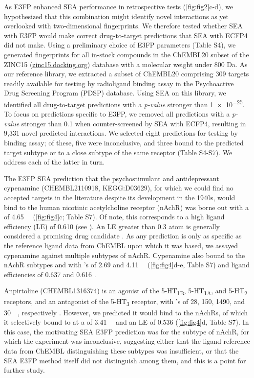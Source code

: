 \documentclass[../main.tex]{subfiles}
\begin{document}
\begin{refsection}
As E3FP enhanced SEA performance in retrospective tests (\cref{fig:fig2}c-d), we hypothesized that this combination might identify novel interactions as yet overlooked with two-dimensional fingerprints.
We therefore tested whether SEA with E3FP would make correct drug-to-target predictions that SEA with ECFP4 did not make.
Using a preliminary choice of E3FP parameters (Table S4), we generated fingerprints for all in-stock compounds in the ChEMBL20 subset of the ZINC15 (\url{zinc15.docking.org}) database with a molecular weight under 800 Da.
As our reference library, we extracted a subset of ChEMBL20 comprising 309 targets readily available for testing by radioligand binding assay in the Psychoactive Drug Screening Program (PDSP) \cite{besnard_2012} database.
Using SEA on this library, we identified all drug-to-target predictions with a  \emph{p-value} stronger than \num{1e-25}.
To focus on predictions specific to E3FP, we removed all predictions with a  \emph{p-value} stronger than 0.1 when counter-screened by SEA with ECFP4, resulting in 9,331 novel predicted interactions.
We selected eight predictions for testing by binding assay; of these, five were inconclusive, and three bound to the predicted target subtype or to a close subtype of the same receptor (Table S4-S7).
We address each of the latter in turn.

    The E3FP SEA prediction that the psychostimulant and antidepressant  \cite{kanehisa_2017,kanehisa_2016,kanehisa_2000} cypenamine (CHEMBL2110918, KEGG:D03629), for which we could find no accepted targets in the literature despite its development in the 1940s, would bind to the human nicotinic acetylcholine receptor (nAchR)  was borne out with a  \Ki{} of \SI{4.65}{\micro\molar} (\cref{fig:fig4}c; Table S7).
Of note, this corresponds to a high ligand efficiency (LE) of 0.610  \LEunit{} (see ).
An LE greater than 0.3  \LEunit{} atom is generally considered a promising drug candidate  \cite{hopkins_2014}.
As any prediction is only as specific as the reference ligand data from ChEMBL upon which it was based, we assayed cypenamine against multiple subtypes of nAchR.
Cypenamine also bound to the nAchR subtypes  and  with \Ki's of 2.69 and \SI{4.11}{\micro\molar} (\cref{fig:fig4}d-e, Table S7) and ligand efficiencies of 0.637 and 0.616 \LEunit{}.

    Anpirtoline (CHEMBL1316374) is an agonist of the 5-HT\textsubscript{1B}, 5-HT\textsubscript{1A}, and 5-HT\textsubscript{2} receptors, and an antagonist of the 5-HT\textsubscript{3} receptor, with  \Ki's of 28, 150, 1490, and \SI{30}{\nano\molar}, respectively  \cite{schlicker_1992,metzenauer_1992}.
However, we predicted it would bind to the nAchRs, of which it selectively bound to  at a  \Ki{} of \SI{3.41}{\micro\molar} and an LE of 0.536 \LEunit{} (\cref{fig:fig4}d, Table S7).
In this case, the motivating SEA E3FP prediction was for the  subtype of nAchR, for which the experiment was inconclusive, suggesting either that the ligand reference data from ChEMBL distinguishing these subtypes was insufficient, or that the SEA E3FP method itself did not distinguish among them, and this is a point for further study.


\end{refsection}
\end{document}
